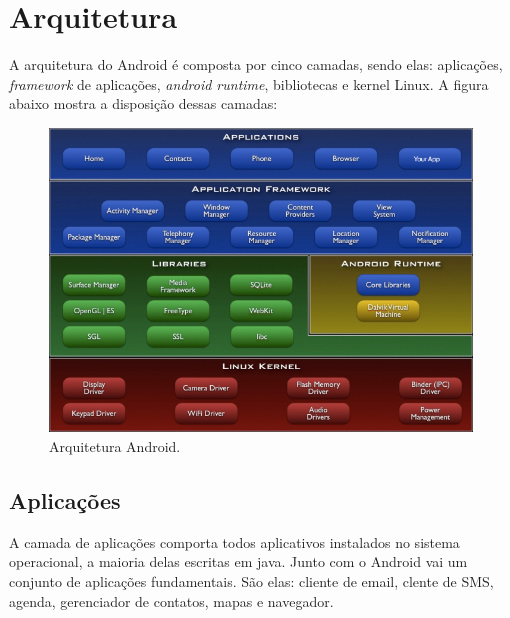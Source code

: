 \section{Arquitetura}
  A arquitetura do Android é composta por cinco camadas, sendo elas: aplicações, 
  \textit{framework} de aplicações, \textit{android runtime}, bibliotecas e kernel Linux.
  A figura abaixo mostra a disposição dessas camadas:
\begin{figure}[hb]
\centering
\includegraphics[scale=0.45]{images/Android-architecture.jpg}
\caption{Arquitetura Android\cite{android1}. }
\label{fig:android-arc}
\end{figure}
	
	
\subsection{Aplicações}
 A camada de aplicações comporta todos aplicativos instalados no sistema operacional, a maioria delas escritas em java.
Junto com o Android vai um conjunto de aplicações fundamentais. São elas: cliente de email, clente de SMS, agenda, gerenciador de contatos,
mapas e navegador.

